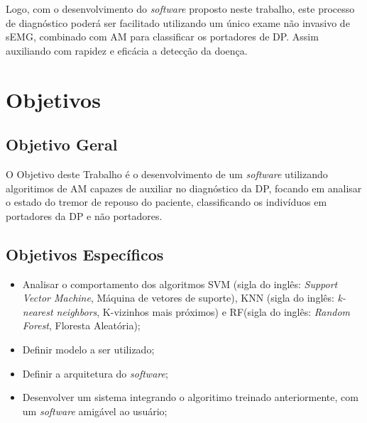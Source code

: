 Logo, com o desenvolvimento do \textit{software} proposto neste trabalho, este processo de diagnóstico poderá ser facilitado utilizando um único exame não invasivo de sEMG, combinado com AM para classificar os portadores de DP. Assim auxiliando com rapidez e eficácia a detecção da doença. 

\section{Objetivos} 
\subsection{Objetivo Geral} 
O Objetivo deste Trabalho é o desenvolvimento de um \textit{software} utilizando algoritimos de AM capazes de auxiliar no diagnóstico da DP, focando em analisar o estado do tremor de repouso do paciente, classificando os indivíduos em portadores da DP e não portadores. 

\subsection{Objetivos Específicos}
\begin{itemize}
    \item Analisar o comportamento dos algoritmos SVM (sigla do inglês: \textit{Support Vector Machine}, Máquina de vetores de suporte), KNN (sigla do inglês: \textit{k-nearest neighbors}, K-vizinhos mais próximos) e RF(sigla do inglês: \textit{Random Forest}, Floresta Aleatória);
    \item Definir modelo a ser utilizado;
    \item Definir a arquitetura do \textit{software};
    \item Desenvolver um sistema integrando o algoritimo treinado anteriormente, com um \textit{software} amigável ao usuário;
\end{itemize}